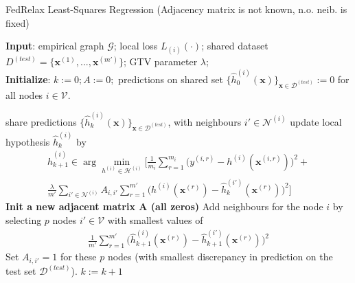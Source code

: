 \documentclass{article}
\newcommand{\graph}{\mathcal{G}}
\begin{document}
\begin{algorithm}[htbp]
	\caption{FedRelax Least-Squares Regression (Adjacency matrix is not known, n.o. neib. is fixed)}
	\label{alg_X_param}
	{\bf Input}: empirical graph $\graph$; 
	local loss $L_{(i)}{(\cdot)}$; shared dataset $D^{(test)} = \{\mathbf{x}^{(1)}, ..., \mathbf{x}^{(m')}\}$; GTV parameter $\lambda$; \\
	{\bf Initialize}: $k:=0; A:=0;$ predictions on shared set $\{\widehat{h}_{0}^{(i)}(\mathbf{x})\}_{\mathbf{x} \in \mathcal{D}^(test)}:=0$ for all nodes $i \in \mathcal{V}$.
	\begin{algorithmic}[1]
		\State share predictions $\{\widehat{h}_{k}^{(i)}(\mathbf{x})\}_{\mathbf{x} \in \mathcal{D}^(test)}$, 
		with neighbours $i' \in \mathcal{N}^{(i)}$ 
		\State update local hypothesis $\widehat{h}_{k}^{(i)}$ by
            \begin{multline*}
            \widehat{h}_{k+1}^{(i)} \in  \arg \min_{h^{(i)} \in \mathcal{H}^{(i)}} 
            \biggl[ \frac{1}{m_i}  \sum_{r=1}^{m_i} \biggl( y^{(i,r)} - h^{(i)}(\mathbf{x}^{(i,r)})  \biggr)^2 + \\
            \frac{\lambda}{m'} \sum_{i' \in \mathcal{N}^{(i)}}A_{i,i'}\sum_{r=1}^{m'} \biggl( h^{(i)}(\mathbf{x}^{(r)}) - \widehat{h}_{k}^{(i')}(\mathbf{x}^{(r)}) \biggr)^2 \biggr]
            \end{multline*}
		\EndFor
        \State \textbf{Init a new adjacent matrix A (all zeros)}
        \State Add neighbours for the node $i$ by selecting $p$ nodes $i' \in \mathcal{V}$ with smallest values of
             \begin{align}
                \frac{1}{m'} \sum_{r=1}^{m'} \biggl( \widehat{h}_{k+1}^{(i)}(\mathbf{x}^{(r)}) - \widehat{h}_{k+1}^{(i')}(\mathbf{x}^{(r)}) \biggr)^2 
             \end{align}
        \State Set $A_{i,i'} = 1$ for these $p$ nodes (with smallest discrepancy in prediction on the test set $\mathcal{D}^{(test)}$).
        \EndFor
        \State $k := k+1$
		\EndWhile
	\end{algorithmic}
\end{algorithm}
\end{document}
